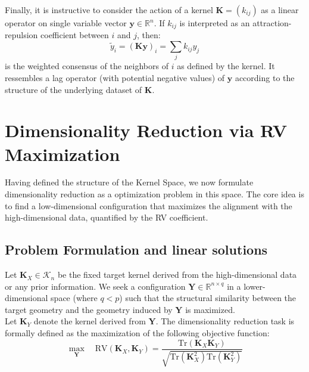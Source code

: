 \documentclass[11pt]{article}
\begin{document}
	Finally, it is instructive to consider the action of a kernel $\mathbf{K} = (k_{ij})$ as a linear operator on single variable vector $\mathbf{y} \in \mathbb{R}^n$. If $k_{ij}$ is interpreted as an attraction-repulsion coefficient between $i$ and $j$, then:
	\begin{equation}
		\tilde{y}_i = (\mathbf{K}\mathbf{y})_i = \sum_j k_{ij} y_j
	\end{equation}
	is the weighted consensus of the neighbors of $i$ as defined by the kernel. It ressembles a lag operator (with potential negative values) of $\mathbf{y}$ according to the structure of the underlying dataset of $\mathbf{K}$.
	
	
	\section{Dimensionality Reduction via RV Maximization}
	\label{section:rv_maximization}
	
	Having defined the structure of the Kernel Space, we now formulate dimensionality reduction as a optimization problem in this space. The core idea is to find a low-dimensional configuration that maximizes the alignment with the high-dimensional data, quantified by the RV coefficient.
	
	
	\subsection{Problem Formulation and linear solutions}
	
	Let $\mathbf{K}_X \in \mathcal{K}_n$ be the fixed target kernel derived from the high-dimensional data or any prior information. We seek a configuration $\mathbf{Y} \in \mathbb{R}^{n \times q}$ in a lower-dimensional space (where $q < p$) such that the structural similarity between the target geometry and the geometry induced by $\mathbf{Y}$ is maximized. \\
	
	Let $\mathbf{K}_Y$ denote the kernel derived from $\mathbf{Y}$. The dimensionality reduction task is formally defined as the maximization of the following objective function:
	\begin{equation} \label{eq:optimization_problem}
		\max_{\mathbf{Y}} \quad \text{RV}(\mathbf{K}_X, \mathbf{K}_Y) = \frac{\text{Tr}(\mathbf{K}_X \mathbf{K}_Y)}{\sqrt{\text{Tr}(\mathbf{K}_X^2)\text{Tr}(\mathbf{K}_Y^2)}}
	\end{equation}
	
\end{document}

